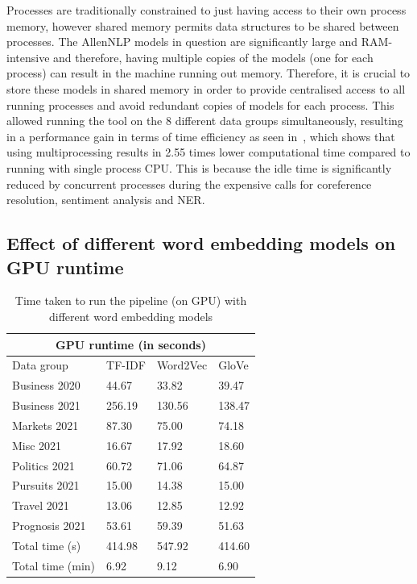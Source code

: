 Processes are traditionally constrained to just having access to their own process memory, however shared memory permits data structures to be shared between processes. The AllenNLP models in question are significantly large and RAM-intensive and therefore, having multiple copies of the models (one for each process) can result in the machine running out memory. Therefore, it is crucial to store these models in shared memory in order to provide centralised access to all running processes and avoid redundant copies of models for each process. This allowed running the tool on the 8 different data groups simultaneously, resulting in a performance gain in terms of time efficiency as seen in~, which shows that using multiprocessing results in 2.55 times lower computational time compared to running with single process CPU. This is because the idle time is significantly reduced by concurrent processes during the expensive calls for coreference resolution, sentiment analysis and NER. 

\subsection{Effect of different word embedding models on GPU runtime}
\vspace{-1ex}
\begin{table}[H]
\centering
\renewcommand{\arraystretch}{1.05}
\begin{tabularx}{0.9\textwidth}{X X X X} 
\multicolumn{4}{c}{GPU runtime (in seconds)} \\
 \hline
 Data group & TF-IDF & Word2Vec & GloVe \\
 \hline
 Business 2020 & 44.67& 33.82& 39.47 \\ 
 Business 2021 & 256.19 & 130.56 & 138.47 \\
 Markets 2021 & 87.30 & 75.00 & 74.18 \\
 Misc 2021 & 16.67 & 17.92 & 18.60 \\
 Politics 2021 & 60.72 & 71.06 & 64.87 \\
 Pursuits 2021 & 15.00 & 14.38 & 15.00 \\ 
 Travel 2021 & 13.06 & 12.85 & 12.92 \\
 Prognosis 2021 & 53.61 & 59.39 & 51.63 \\ 
 \hline
 Total time (s) & 414.98 & 547.92 & 414.60 \\ 
  Total time (min) & 6.92 & 9.12 & 6.90 \\ 
\end{tabularx}
\caption{Time taken to run the pipeline (on GPU) with different word embedding models}
\label{table:word_embed_time}
\end{table}

